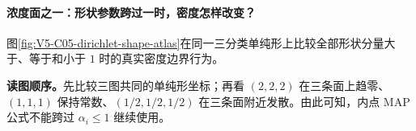 \documentclass[UTF8,a4paper,11pt,openany]{ctexbook}
\begin{document}
\setcounter{page}{665}
\setcounter{chapter}{34}
\setcounter{section}{5}
\setcounter{figure}{7}
\setcounter{equation}{22}
\pagestyle{headings}
\paragraph{浓度面之一：形状参数跨过一时，密度怎样改变？}
图\ref{fig:V5-C05-dirichlet-shape-atlas}在同一三分类单纯形上比较全部形状分量大于、等于和小于 $1$ 时的真实密度边界行为。

\FloatBarrier
\noindent\textbf{读图顺序。}先比较三图共同的单纯形坐标；再看 $(2,2,2)$ 在三条面上趋零、$(1,1,1)$ 保持常数、$(1/2,1/2,1/2)$ 在三条面附近发散。由此可知，内点 MAP 公式不能跨过 $\alpha_i\le1$ 继续使用。\par
\end{document}
